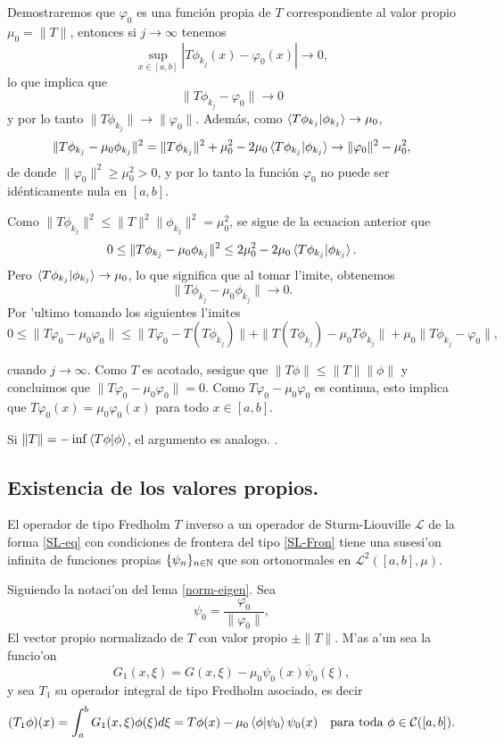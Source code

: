 \documentclass[main.tex]{subfiles}
\begin{document}
Demostraremos que $\varphi_0$ es una función propia de $T$ correspondiente al valor propio $\mu_0 = \|T\|$, entonces si $j \to \infty$ tenemos
\[
\sup_{x \in [a,b]} |T \phi_{k_j}(x) - \varphi_0(x)| \to 0,
\]
lo que implica que
\begin{equation}
\|T \phi_{k_j} - \varphi_0\| \to 0
\end{equation}
y por lo tanto $\|T \phi_{k_j}\| \to \|\varphi_0\|$. Además, como $\braket{T\phi_{k_j}| \phi_{k_j}}\to\mu_0$,
\begin{equation}
\|T\phi_{k_j}-\mu_0\phi_{k_j}\|^2=\|T\phi_{k_j}\|^2+\mu_0^2-2\mu_0\braket{T\phi_{k_j}|\phi_{k_j}}\to\|\varphi_0\|^2 - \mu_0^2,
\end{equation}
de donde $\|\varphi_0\|^2 \geq \mu_0^2 > 0$, y por lo tanto la función $\varphi_0$ no puede ser idénticamente nula en $[a,b]$.

Como $\|T\phi_{k_j}\|^2 \leq \|T\|^2 \|\phi_{k_j}\|^2 = \mu_0^2$, se sigue de la ecuacion anterior que
\[
0\leq\|T\phi_{k_j}-\mu_0\phi_{k_j}\|^2 \leq2\mu_0^2-2\mu_0\braket{T\phi_{k_j}|\phi_{k_j}}.
\]
Pero $\braket{T\phi_{k_j}|\phi_{k_j}} \to \mu_0$, lo que significa que al tomar l'imite, obtenemos
\[
\|T\phi_{k_j} - \mu_0 \phi_{k_j}\|\to 0.
\]
Por 'ultimo tomando los siguientes l'imites
\[
0\leq\|T\varphi_0-\mu_0\varphi_0\|\leq\|T\varphi_0-T(T\phi_{k_j})\|+\|T(T\phi_{k_j})-\mu_0T\phi_{k_j}\|+ \mu_0\|T\phi_{k_j} - \varphi_0\|,
\]

cuando $j\to\infty$. Como $T$ es acotado, sesigue que $\|T\phi\|\leq\|T\|\|\phi\|$ y concluimos que $\|T\varphi_0-\mu_0\varphi_0\|=0$. Como $T\varphi_0 - \mu_0\varphi_0$ es continua, esto implica que $T \varphi_0(x) = \mu_0 \varphi_0(x)$ para todo $x \in [a,b]$.

Si $\|T\| = -\inf \braket{T\phi|\phi}$, el argumento es analogo. \QED.

\subsection{Existencia de los valores propios.}
\begin{teorema}
  El operador de tipo Fredholm $T$ inverso a un operador de Sturm-Liouville $\mathcal{L}$ de la forma \ref{SL-eq} con condiciones de frontera del tipo \ref{SL-Fron} tiene una susesi'on infinita de funciones propias $\{\psi_{n}\}_{n\in \mathbb N }$ que son ortonormales en $\mathcal{L}^{2}([a,b],\mu)$.
\end{teorema}
\dem  Siguiendo la notaci'on del lema \ref{norm-eigen}. Sea
\[
\psi_0 = \frac{\varphi_0}{\|\varphi_0\|},
\]
El vector propio normalizado de $T$ con valor propio $\pm\|T\|$. M'as a'un sea la funcio'on
\[
G_1(x,\xi) = G(x,\xi) - \mu_0 \psi_0(x)\overline{\psi}_0(\xi),
\]
y sea $T_{1}$ su operador integral de tipo Fredholm asociado, es decir
\[
(T_1\phi)(x)=\int_a^bG_1(x,\xi)\phi(\xi)d\xi=T\phi(x)-\mu_0\braket{\phi|\psi_0}\psi_0(x) \quad \text{para toda }\phi\in \mathcal{C}([a, b]).
\]
\end{document}
